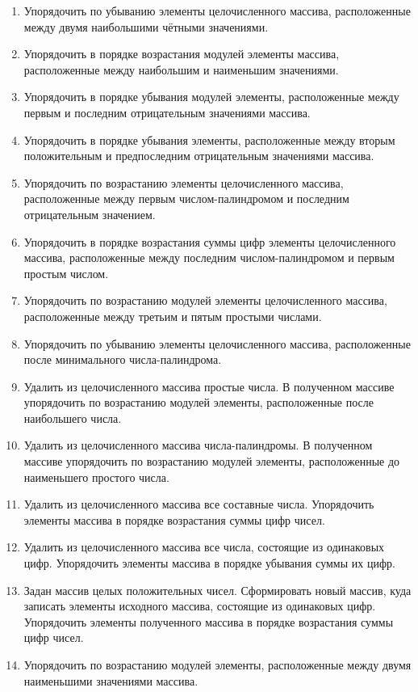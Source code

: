 \begin{enumerate}
\item Упорядочить по убыванию элементы целочисленного массива, расположенные между двумя наибольшими чётными значениями.
\item Упорядочить в порядке возрастания модулей элементы массива, расположенные между наибольшим и наименьшим
значениями.
\item Упорядочить в порядке убывания модулей элементы, расположенные между первым и последним отрицательным значениями
массива.
\item Упорядочить в порядке убывания элементы, расположенные между вторым положительным и предпоследним отрицательным
значениями массива.
\item Упорядочить по возрастанию элементы целочисленного массива, расположенные между первым числом-палиндромом и
последним отрицательным значением.
\item Упорядочить в порядке возрастания суммы цифр элементы целочисленного массива, расположенные между последним
числом-палиндромом и первым простым числом.
\item Упорядочить по возрастанию модулей элементы целочисленного массива, расположенные между третьим и пятым простыми
числами.
\item Упорядочить по убыванию элементы целочисленного массива, расположенные после минимального числа-палиндрома.
\item Удалить из целочисленного массива простые числа. В полученном массиве упорядочить по возрастанию модулей элементы,
расположенные после наибольшего числа.
\item Удалить из целочисленного массива числа-палиндромы. В полученном массиве упорядочить по возрастанию модулей
элементы, расположенные до наименьшего простого числа.
\item Удалить из целочисленного массива все составные числа. Упорядочить элементы массива в порядке возрастания суммы
цифр чисел.
\item Удалить из целочисленного массива все числа, состоящие из одинаковых цифр. Упорядочить элементы массива в порядке
убывания суммы их цифр.
\item Задан массив целых положительных чисел. Сформировать новый массив, куда записать элементы исходного массива,
состоящие из одинаковых цифр. Упорядочить элементы полученного массива в порядке возрастания суммы цифр чисел.
\item Упорядочить по возрастанию модулей элементы, расположенные между двумя наименьшими значениями массива.

\end{enumerate}
